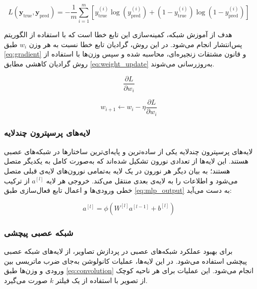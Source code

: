 \begin{latin}
\begin{equation}
\label{eq:bce_loss}
L(\mathbf{y}_{\text{true}}, \mathbf{y}_{\text{pred}}) = -\frac{1}{m} \sum_{i=1}^{m} \left[ y_{\text{true}}^{(i)} \log(y_{\text{pred}}^{(i)}) + (1 - y_{\text{true}}^{(i)}) \log(1 - y_{\text{pred}}^{(i)}) \right]
\end{equation}
\end{latin}


هدف از آموزش شبکه، کمینه‌سازی این تابع خطا است که با استفاده از الگوریتم پس‌انتشار انجام می‌شود. در این روش، گرادیان
 تابع خطا نسبت به هر وزن \(w_i\) طبق \autoref{eq:gradient} و قانون مشتقات زنجیره‌ای، محاسبه شده و سپس وزن‌ها با استفاده از روش گرادیان کاهشی مطابق \autoref{eq:weight_update} به‌روزرسانی می‌شوند.

\begin{latin}
\begin{equation}
\label{eq:gradient}
\frac{\partial L}{\partial w_i}
\end{equation}
\end{latin}

\begin{latin}
\begin{equation}
\label{eq:weight_update}
w_{i+1} \leftarrow w_i - \eta \frac{\partial L}{\partial w_i}
\end{equation}
\end{latin}

\subsubsection{لایه‌های پرسپترون
\protect{}
 چندلایه}
لایه‌های پرسپترون چندلایه
 یکی از ساده‌ترین و پایه‌ای‌ترین ساختارها در شبکه‌های عصبی هستند. این لایه‌ها از تعدادی نورون تشکیل شده‌اند که به‌صورت کامل به یکدیگر متصل هستند؛ به بیان دیگر هر نورون در یک لایه به‌تمامی نورون‌های لایه‌ی قبلی متصل می‌شود و اطلاعات را به لایه‌ی بعدی منتقل می‌کند. خروجی هر لایه \(a^{[l]}\) از ترکیب خطی ورودی‌ها و اعمال تابع فعال‌سازی طبق \autoref{eq:mlp_output} به دست می‌آید:

\begin{latin}
\begin{equation}
\label{eq:mlp_output}
a^{[l]} = \phi(W^{[l]} a^{[l-1]} + b^{[l]})
\end{equation}
\end{latin}

\subsubsection{شبکه عصبی پیچشی
\protect{}}
برای بهبود عملکرد شبکه‌های عصبی در پردازش تصاویر، از لایه‌های شبکه عصبی پیچشی
استفاده می‌شود. در این لایه‌ها، عملیات کانولوشن به‌جای ضرب ماتریسی بین ورودی و وزن‌ها طبق \autoref{eq:convolution} انجام می‌شود. این عملیات برای هر ناحیه کوچک از تصویر با استفاده از یک فیلتر \(k\) صورت می‌گیرد.

